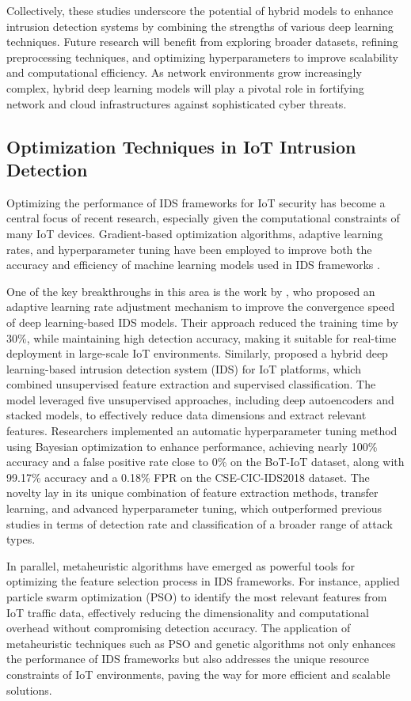 Collectively, these studies underscore the potential of hybrid models to enhance intrusion detection systems by combining the strengths of various deep learning techniques. Future research will benefit from exploring broader datasets, refining preprocessing techniques, and optimizing hyperparameters to improve scalability and computational efficiency. As network environments grow increasingly complex, hybrid deep learning models will play a pivotal role in fortifying network and cloud infrastructures against sophisticated cyber threats.

\subsection{Optimization Techniques in IoT Intrusion Detection}
Optimizing the performance of IDS frameworks for IoT security has become a central focus of recent research, especially given the computational constraints of many IoT devices. Gradient-based optimization algorithms, adaptive learning rates, and hyperparameter tuning have been employed to improve both the accuracy and efficiency of machine learning models used in IDS frameworks \cite{dasari2024effective, chen2024fast}.

One of the key breakthroughs in this area is the work by \citet{wei2024efficient}, who proposed an adaptive learning rate adjustment mechanism to improve the convergence speed of deep learning-based IDS models. Their approach reduced the training time by 30\%, while maintaining high detection accuracy, making it suitable for real-time deployment in large-scale IoT environments. Similarly, \citet{kunang2024end} proposed a hybrid deep learning-based intrusion detection system (IDS) for IoT platforms, which combined unsupervised feature extraction and supervised classification. The model leveraged five unsupervised approaches, including deep autoencoders and stacked models, to effectively reduce data dimensions and extract relevant features. Researchers implemented an automatic hyperparameter tuning method using Bayesian optimization to enhance performance, achieving nearly 100\% accuracy and a false positive rate close to 0\% on the BoT-IoT dataset, along with 99.17\% accuracy and a 0.18\% FPR on the CSE-CIC-IDS2018 dataset. The novelty lay in its unique combination of feature extraction methods, transfer learning, and advanced hyperparameter tuning, which outperformed previous studies in terms of detection rate and classification of a broader range of attack types.

In parallel, metaheuristic algorithms have emerged as powerful tools for optimizing the feature selection process in IDS frameworks. For instance, \citet{mrudula2024internet} applied particle swarm optimization (PSO) to identify the most relevant features from IoT traffic data, effectively reducing the dimensionality and computational overhead without compromising detection accuracy. The application of metaheuristic techniques such as PSO and genetic algorithms not only enhances the performance of IDS frameworks but also addresses the unique resource constraints of IoT environments, paving the way for more efficient and scalable solutions.

